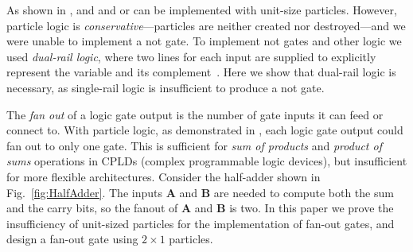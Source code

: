 \documentclass[letterpaper, 10 pt, conference]{ieeeconf}
\begin{document}
As shown in \cite{Becker2013f}, {\sc and} and {\sc or} can be implemented with
unit-size particles.  However, particle logic is \emph{conservative}---particles
are neither created nor destroyed---and we were unable to implement a {\sc not}
gate. To implement {\sc not} gates and other logic we used \emph{dual-rail
logic}, where two lines for each input are supplied to explicitly represent the
variable and its complement~\cite{Becker2014a}. Here we show that dual-rail
logic is necessary, as single-rail logic is insufficient to produce a {\sc not}
gate. 

  The \emph{fan out} of a logic gate output is the number of gate inputs it can feed or connect to.  With particle logic, as demonstrated in  \cite{Becker2014}, each logic gate output could fan out to only one gate.  This is sufficient for \emph{sum of products} and \emph{product of sums}  operations in CPLDs (complex programmable logic devices), but insufficient for more flexible architectures.
%  
    Consider the half-adder shown in Fig.~\ref{fig:HalfAdder}.  The inputs $\mathbf{A}$ and  $\mathbf{B}$ are needed to compute both the {\sc sum} and the {\sc carry} bits, so the fanout of $\mathbf{A}$ and  $\mathbf{B}$ is two. In this paper we prove the insufficiency of unit-sized particles for the implementation of fan-out gates, and design a fan-out gate using $2\times 1$ particles. 
  
  



\end{document}
